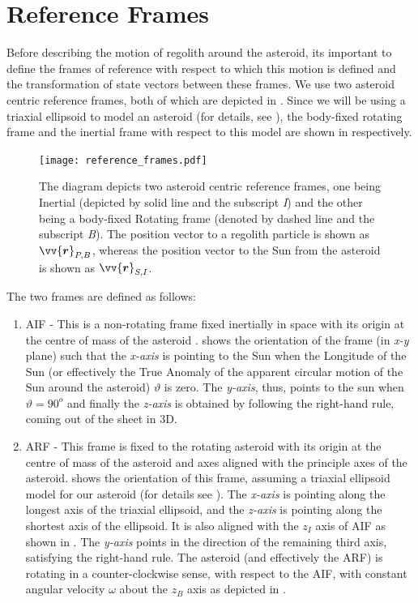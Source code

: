 \section{Reference Frames}
\label{sec:reference_frames}
Before describing the motion of regolith around the asteroid, its important to define the frames of reference with respect to which this motion is defined and the transformation of state vectors between these frames. We use two asteroid centric reference frames, both of which are depicted in . Since we will be using a triaxial ellipsoid to model an asteroid (for details, see ), the body-fixed rotating frame and the inertial frame with respect to this model are shown in  respectively.
\begin{figure}[htb]
\centering
\captionsetup{justification=centering}
\texttt{[image: reference\_frames.pdf]}
\caption{The diagram depicts two asteroid centric reference frames, one being Inertial (depicted by solid line and the subscript \emph{I}) and the other being a body-fixed Rotating frame (denoted by dashed line and the subscript \emph{B}). The position vector to a regolith particle is shown as $\protect\vv{\bm{r}}_{P,B}$, whereas the position vector to the Sun from the asteroid is shown as $\protect\vv{\bm{r}}_{S,I}$.}
\label{fig:reference_frame}
\end{figure}
\FloatBarrier
The two frames are defined as follows:
\begin{enumerate}
\item \gls{AIF} - This is a non-rotating frame fixed inertially in space with its origin at the centre of mass of the asteroid .  shows the orientation of the frame (in \emph{x-y} plane) such that the \emph{x-axis} is pointing to the Sun when the Longitude of the Sun (or effectively the True Anomaly of the apparent circular motion of the Sun around the asteroid) $\vartheta$ is zero. The \emph{y-axis}, thus, points to the sun when $\vartheta = 90^o$ and finally the \emph{z-axis} is obtained by following the right-hand rule, coming out of the sheet in 3D.
%
\item \gls{ARF} - This frame is fixed to the rotating asteroid with its origin at the centre of mass of the asteroid and axes aligned with the principle axes of the asteroid.  shows the orientation of this frame, assuming a triaxial ellipsoid model for our asteroid (for details see ). The \emph{x-axis} is pointing along the longest axis of the triaxial ellipsoid, and the \emph{z-axis} is pointing along the shortest axis of the ellipsoid. It is also aligned with the $z_I$ axis of \gls{AIF} as shown in . The \emph{y-axis} points in the direction of the remaining third axis, satisfying the right-hand rule. The asteroid (and effectively the \gls{ARF}) is rotating in a counter-clockwise sense, with respect to the \gls{AIF}, with constant angular velocity $\omega$ about the $z_B$ axis as depicted in .
\end{enumerate}
